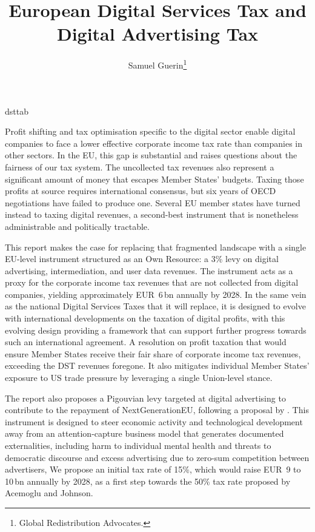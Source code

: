 \documentclass[../../main]{subfiles}
\begin{document}
\ifcsname dsttab\endcsname\else
\newenvironment{dsttab}[1]{%
  \begingroup\setlength\tabcolsep{3pt}\small
  \setlength{\extrarowheight}{2pt}%
  \begin{longtable}{#1}%
}{%
  \end{longtable}\endgroup
}
\fi

\title{European Digital Services Tax and Digital Advertising Tax}
\author{Samuel Guerin\thanks{Global Redistribution Advocates.}}

\maketitle

Profit shifting and tax optimisation specific to the digital sector enable digital companies to face a lower effective corporate income tax rate than companies in other sectors.
In the EU, this gap is substantial and raises questions about the fairness of our tax system.
The uncollected tax revenues also represent a significant amount of money that escapes Member States' budgets.
Taxing those profits at source requires international consensus, but six years of OECD negotiations have failed to produce one.
Several EU member states have turned instead to taxing digital revenues, a second-best instrument that is nonetheless administrable and politically tractable.

This report makes the case for replacing that fragmented landscape with a single EU-level instrument structured as an Own Resource: a 3\% levy on digital advertising, intermediation, and user data revenues.
The instrument acts as a proxy for the corporate income tax revenues that are not collected from digital companies, yielding approximately EUR~6\,bn annually by 2028.
In the same vein as the national Digital Services Taxes that it will replace, it is designed to evolve with international developments on the taxation of digital profits, with this evolving design providing a framework that can support further progress towards such an international agreement.
A resolution on profit taxation that would ensure Member States receive their fair share of corporate income tax revenues, exceeding the DST revenues foregone. %
It also mitigates individual Member States' exposure to US trade pressure by leveraging a single Union-level stance.

The report also proposes a Pigouvian levy targeted at digital advertising to contribute to the repayment of NextGenerationEU, following a proposal by \cite{acemoglu_johnson_2024_ad_tax}.
This instrument is designed to steer economic activity and technological development away from an attention-capture business model that generates documented externalities, including harm to individual mental health and threats to democratic discourse and excess advertising due to zero-sum competition between advertisers, 
We propose an initial tax rate of 15\%, which would raise EUR~9 to 10\,bn annually by 2028, as a first step towards the 50\% tax rate proposed by Acemoglu and Johnson.
\end{document}
